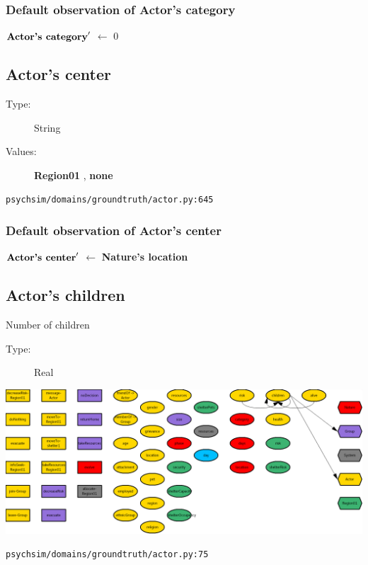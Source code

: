 \documentclass{article}%
\begin{document}
%
\subsubsection{Default observation of Actor's category}%
\label{ssubsec:Default observation of Actor's category}%
\begin{flushleft}%
$\mbox{\textbf{Actor's category}} '$%
$\leftarrow$%
0%
\end{flushleft}

%
\subsection{Actor's center}%
\label{subsec:Actor's center}%
\begin{description}%
\item[Type:]%
String%
\item[Values:]%
\textbf{Region01}%
, %
\textbf{none}%
\end{description}%
\begin{flushleft}%
\verb|psychsim/domains/groundtruth/actor.py:645|%
\end{flushleft}%
\subsubsection{Default observation of Actor's center}%
\label{ssubsec:Default observation of Actor's center}%
\begin{flushleft}%
$\mbox{\textbf{Actor's center}} '$%
$\leftarrow$%
\textbf{Nature's location}%
\end{flushleft}

%
\subsection{Actor's children}%
\label{subsec:Actor's children}%
Number of children%
\begin{description}%
\item[Type:]%
Real%
\end{description}%
\includegraphics[width=\textwidth]{images/childrenOfActor.png}%
\begin{flushleft}%
\verb|psychsim/domains/groundtruth/actor.py:75|%
\end{flushleft}
\end{document}

